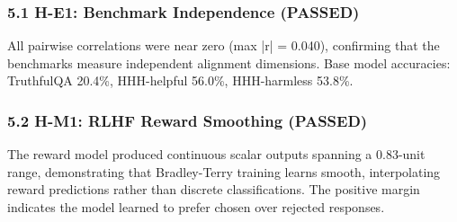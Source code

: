 
\subsubsection{5.1 H-E1: Benchmark Independence (PASSED)}

\begin{table}[htbp]
\centering
{}
\end{table}

All pairwise correlations were near zero (max |r| = 0.040), confirming that the benchmarks measure independent alignment dimensions. Base model accuracies: TruthfulQA 20.4\%, HHH-helpful 56.0\%, HHH-harmless 53.8\%.

\subsubsection{5.2 H-M1: RLHF Reward Smoothing (PASSED)}

\begin{table}[htbp]
\centering
{}
\end{table}

The reward model produced continuous scalar outputs spanning a 0.83-unit range, demonstrating that Bradley-Terry training learns smooth, interpolating reward predictions rather than discrete classifications. The positive margin indicates the model learned to prefer chosen over rejected responses.

